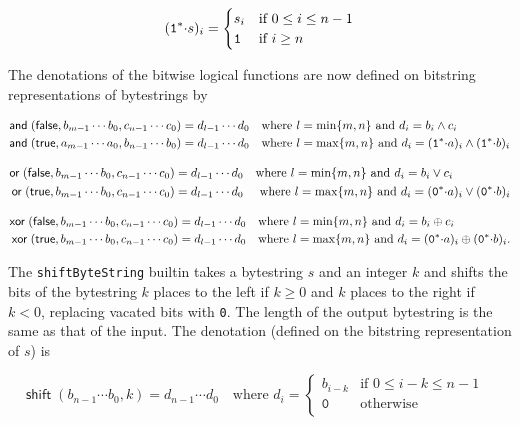 $$
(\mathtt{1}^*{\cdot}s)_i =
\begin{cases}
  s_i & \text{if $0 \leq i \leq n-1$}\\
  \mathtt{1} & \text{if $i \geq n$}
\end{cases}
$$

\noindent The denotations of the bitwise logical functions are now defined on
bitstring representations of bytestrings by

\begin{align*}
\mathsf{and}\;(\mathsf{false}, b_{m-1} \cdots b_0, c_{n-1} \cdots c_0) &= d_{l-1} \cdots d_0 
\quad \text{where $l=\min\{m,n\}$ and $d_i = b_i \wedge c_i$}\\
\mathsf{and}\;(\mathsf{true}, a_{m-1} \cdots a_0, b_{n-1} \cdots b_0) &= d_{l-1} \cdots d_0
\quad \text{where $l=\max\{m,n\}$ and $d_i = (\mathtt{1}^*{\cdot}a)_i \wedge(\mathtt{1}^*{\cdot}b)_i$}
\end{align*}


\begin{align*}
\mathsf{or}\;(\mathsf{false}, b_{m-1} \cdots b_0, c_{n-1} \cdots c_0) &= d_{l-1} \cdots d_0
  \quad \text{where $l=\min\{m,n\}$ and $d_i = b_i \vee c_i$}\\
\mathsf{or}\;(\mathsf{true}, b_{m-1} \cdots b_0, c_{n-1} \cdots c_0) &= d_{l-1} \cdots d_0 
\quad \text{ where $l=\max\{m,n\}$ and $d_i = (\mathtt{0}^*{\cdot}a)_i \vee (\mathtt{0}^*{\cdot}b)_i$}
\end{align*}


\begin{align*}
\mathsf{xor}\;(\mathsf{false}, b_{m-1} \cdots b_0, c_{n-1} \cdots c_0) &= d_{l-1} \cdots d_0 
\quad \text{where $l=\min\{m,n\}$ and $d_i = b_i \oplus c_i$}\\
\mathsf{xor}\;(\mathsf{true}, b_{m-1} \cdots b_0, c_{n-1} \cdots c_0) &= d_{l-1} \cdots d_0 
\quad \text{where $l=\max\{m,n\}$ and $d_i = (\mathtt{0}^*{\cdot}a)_i \oplus (\mathtt{0}^*{\cdot}b)_i$.}
\end{align*}


\label{note:shift}
The \texttt{shiftByteString} builtin takes a bytestring $s$ and an integer $k$ and
shifts the bits of the bytestring $k$ places to the left if $k \geq 0$ and $k$
places to the right if $k < 0$, replacing vacated bits with \texttt{0}.  The
length of the output bytestring is the same as that of the input.  The
denotation (defined on the bitstring representation of $s$) is

$$
\mathsf{shift}\;(b_{n-1} \cdots b_0, k) =
  d_{n-1} \cdots d_0 \quad \text{where }
  d_i = \begin{cases}
     b_{i-k} & \text{if $0 \leq i-k \leq n-1$ }\\
     \texttt{0} & \text{otherwise}\\
\end{cases}
$$

